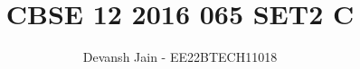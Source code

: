 \documentclass[journal,12pt,onecolumn]{IEEEtran}
\theoremstyle{remark}
\begin{document}
%




\vspace{3cm}

\title{CBSE 12 2016 065 SET2 C}
\author{Devansh Jain - EE22BTECH11018}
	
	


%
%
%

% 
%



% 
\end{document}
